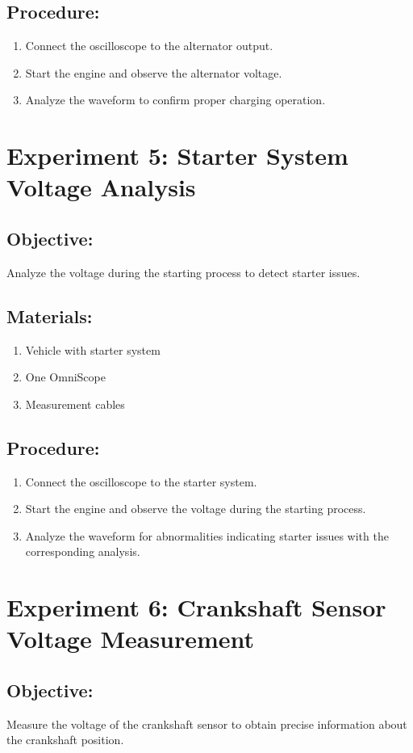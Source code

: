 \documentclass{scrreprt}
\begin{document}
\subsection*{Procedure:}
\begin{enumerate}
    \item Connect the oscilloscope to the alternator output.
    \item Start the engine and observe the alternator voltage.
    \item Analyze the waveform to confirm proper charging operation.
\end{enumerate}

\section*{Experiment 5: Starter System Voltage Analysis}
\subsection*{Objective:} Analyze the voltage during the starting process to detect starter issues.
\subsection*{Materials:}
\begin{enumerate}
    \item Vehicle with starter system
    \item One OmniScope
    \item Measurement cables
\end{enumerate}
\subsection*{Procedure:}
\begin{enumerate}
    \item Connect the oscilloscope to the starter system.
    \item Start the engine and observe the voltage during the starting process.
    \item Analyze the waveform for abnormalities indicating starter issues with the corresponding analysis.
\end{enumerate}

\section*{Experiment 6: Crankshaft Sensor Voltage Measurement}
\subsection*{Objective:} Measure the voltage of the crankshaft sensor to obtain precise information about the crankshaft position.
\end{document}

